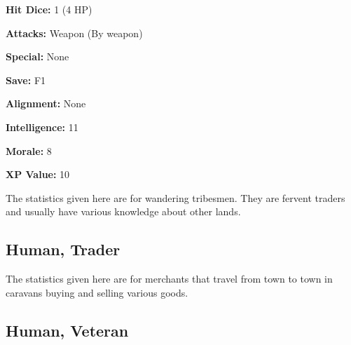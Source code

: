 \begin{multicols*}{2}
{\textbf{Hit Dice:} 1 (4 HP)

\textbf{Attacks:} Weapon (By weapon)

\textbf{Special:} None

\textbf{Save:} F1

\textbf{Alignment:} None

\textbf{Intelligence:} 11

\textbf{Morale:} 8

\textbf{XP Value:} 10}

The statistics given here are for wandering tribesmen. They are fervent traders and usually have various knowledge about other lands.

\subsection{Human, Trader}

The statistics given here are for merchants that travel from town to town in caravans buying and selling various goods.

\subsection{Human, Veteran}
\end{multicols*}
